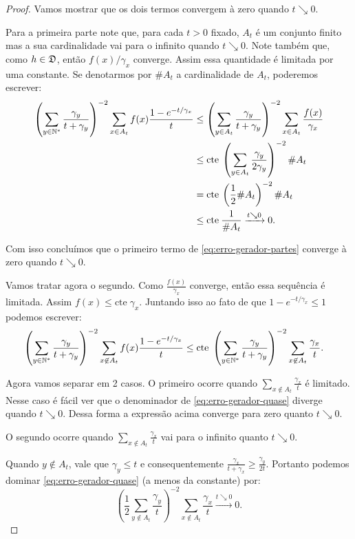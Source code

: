 \begin{proof}
  Vamos mostrar que os dois termos convergem à zero quando $t
  \searrow 0$.

  Para a primeira parte note que, para cada $t > 0$ fixado,
  $A_t$ é um conjunto finito mas a sua cardinalidade vai para o
  infinito quando $t \searrow 0$. Note também que, como $h \in {\mathfrak{D}}$,
  então $f(x)/\gamma_x$ converge. Assim essa quantidade é limitada por
  uma constante. Se denotarmos por $\#A_t$ a cardinalidade de $A_t$,
  poderemos escrever:
  \begin{align*}
    \left( \sum_{y \in {\mathbb{N^*}}} \frac{\gamma_y}{t + \gamma_y} \right)^{-2}
    \sum_{x \in A_t} f(x) \frac{1 - e^{-t/\gamma_x}}{t}
    &\leq
    \left( \sum_{y \in A_t} \frac{\gamma_y}{t + \gamma_y} \right)^{-2}
    \sum_{x \in A_t} \frac{f(x)}{\gamma_x}\\
    &\leq \mathrm{cte} \:
    \left( \sum_{y \in A_t} \frac{\gamma_y}{2 \gamma_y} \right)^{-2}
    \# A_t\\
    &= \mathrm{cte} \:
    \left( \frac{1}{2} \# A_t \right)^{-2}
    \# A_t\\
    &\leq \mathrm{cte} \: \frac{1}{\#A_t}
    \xrightarrow{t \searrow 0} 0.
  \end{align*}

  Com isso concluímos que o primeiro termo de
  \eqref{eq:erro-gerador-partes} converge à zero quando $t \searrow
  0$.

  Vamos tratar agora o segundo. Como $\frac{f(x)}{\gamma_x}$ converge,
  então essa sequência é limitada. Assim $f(x) \leq \mathrm{cte}\;
  \gamma_x$. Juntando isso ao fato de que $1 - e^{-t/\gamma_x} \leq 1$
  podemos escrever:
  \begin{align}
    \label{eq:erro-gerador-quase}
    \left( \sum_{y \in {\mathbb{N^*}}} \frac{\gamma_y}{t + \gamma_y} \right)^{-2}
    \sum_{x \not\in A_t} f(x) \frac{1 - e^{-t/\gamma_x}}{t}
    & \leq \mathrm{cte} \;
    \left( \sum_{y \in {\mathbb{N^*}}} \frac{\gamma_y}{t + \gamma_y} \right)^{-2}
    \sum_{x \not\in A_t} \frac{\gamma_x}{t}.
  \end{align}

  Agora vamos separar em 2 casos.  O primeiro ocorre quando $\sum_{x
    \not\in A_t} \frac{\gamma_x}{t}$ é limitado. Nesse caso é fácil
  ver que o denominador de \eqref{eq:erro-gerador-quase} diverge
  quando $t\searrow 0$. Dessa forma a expressão acima converge para zero
  quanto $t \searrow 0$.


  O segundo ocorre quando $\sum_{x \not\in A_t} \frac{\gamma_x}{t}$
  vai para o infinito quanto $t \searrow 0$.

  Quando $y \not\in A_t$, vale que $\gamma_y \leq t$ e
  consequentemente $\frac{\gamma_x}{t+\gamma_x} \geq \frac{\gamma_y}{2
    t}$. Portanto podemos dominar \eqref{eq:erro-gerador-quase} (a
  menos da constante) por:
  \begin{displaymath}
    \left(
      \frac{1}{2} \sum_{y \not\in A_t} \frac{\gamma_y}{t}
    \right)^{-2}
    \sum_{x \not\in A_t} \frac{\gamma_x}{t} \xrightarrow{t \searrow 0} 0.
  \end{displaymath}
\end{proof}


